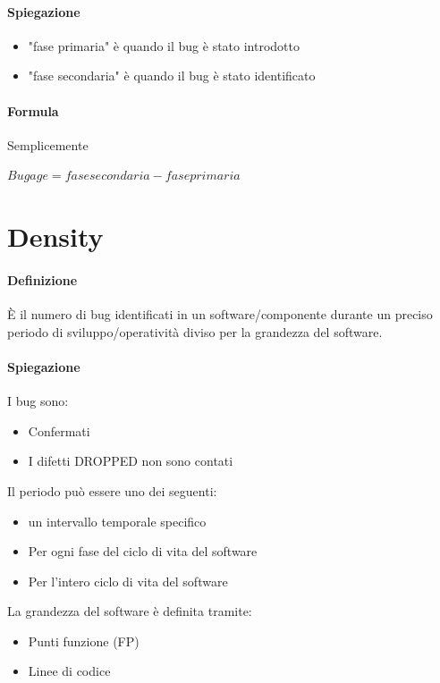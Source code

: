 \documentclass[11pt,a4paper]{book}
\begin{document}
\paragraph{Spiegazione}
\begin{itemize}
	\item "fase primaria" è quando il bug è stato introdotto
	\item "fase secondaria" è quando il bug è stato identificato
\end{itemize}

\paragraph{Formula}
Semplicemente
\begin{center}
	$Bug age = fase secondaria - fase primaria$
\end{center}

\section{Density}
\paragraph{Definizione}
È il numero di bug identificati in un software/componente durante un preciso periodo di sviluppo/operatività diviso per la grandezza del software.

\paragraph{Spiegazione}
I bug sono:
\begin{itemize}
	\item Confermati
	\item I difetti DROPPED non sono contati
\end{itemize}

Il periodo può essere uno dei seguenti:
\begin{itemize}
	\item un intervallo temporale specifico
	\item Per ogni fase del ciclo di vita del software
	\item Per l'intero ciclo di vita del software
\end{itemize}

La grandezza del software è definita tramite:
\begin{itemize}
	\item Punti funzione (FP)
	\item Linee di codice
\end{itemize}
\end{document}
